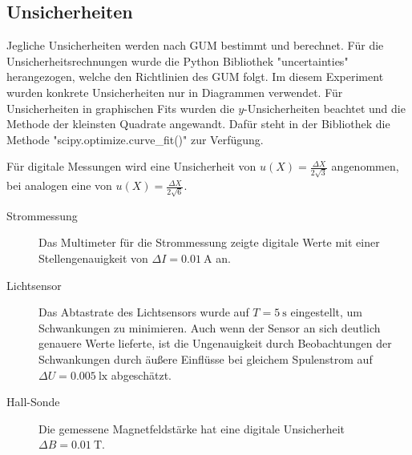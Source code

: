 \subsection{Unsicherheiten}\label{VGuD}

Jegliche Unsicherheiten werden nach GUM bestimmt und berechnet.
Für die Unsicherheitsrechnungen wurde die Python Bibliothek "uncertainties" herangezogen, welche den Richtlinien des GUM folgt.
Im diesem Experiment wurden konkrete Unsicherheiten nur in Diagrammen verwendet. 
Für Unsicherheiten in graphischen Fits wurden die $y$-Unsicherheiten beachtet und die Methode der kleinsten Quadrate angewandt.
Dafür steht in der Bibliothek die Methode "scipy.optimize.curve\_fit()" zur Verfügung.

Für digitale Messungen wird eine Unsicherheit von $u(X) = \frac{\Delta X}{2\sqrt{3}}$ angenommen, bei analogen eine von $u(X) = \frac{\Delta X}{2\sqrt{6}}$.

\begin{description}
	\item[Strommessung] Das Multimeter für die Strommessung zeigte digitale Werte mit einer Stellengenauigkeit von $\Delta I = \SI{0.01}{\ampere}$ an.
	
	\item[Lichtsensor] Das Abtastrate des Lichtsensors wurde auf $T = \SI{5}{\second}$ eingestellt, um Schwankungen zu minimieren.
	Auch wenn der Sensor an sich deutlich genauere Werte lieferte, ist die Ungenauigkeit durch Beobachtungen der Schwankungen durch äußere Einflüsse bei gleichem Spulenstrom auf $\Delta U = \SI{0.005}{\lux}$ abgeschätzt.
	
	\item[Hall-Sonde] Die gemessene Magnetfeldstärke hat eine digitale Unsicherheit $\Delta B = \SI{0.01}{\tesla}$.
\end{description}
